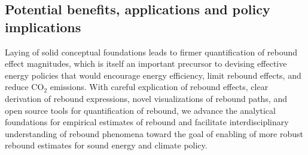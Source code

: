 \documentclass[12pt]{article}    %
\begin{document}
\subsection*{Potential benefits, applications and policy implications}
\label{sec:benefits}

Laying of solid conceptual foundations leads to 
firmer quantification of rebound effect magnitudes, 
which is itself an important precursor
to devising effective energy policies
that would 
encourage energy efficiency, 
limit rebound effects, and
reduce CO$_2$ emissions.
With
careful explication of rebound effects, 
clear derivation of rebound expressions, 
novel visualizations of rebound paths, and
open source tools for quantification of rebound,
we advance the analytical foundations for empirical estimates of rebound and
facilitate interdisciplinary understanding of rebound phenomena
toward the goal of enabling of more robust rebound estimates
for sound energy and climate policy.
\end{document}

